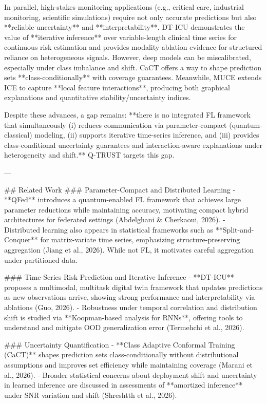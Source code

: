 In parallel, high-stakes monitoring applications (e.g., critical care, industrial monitoring, scientific simulations) require not only accurate predictions but also **reliable uncertainty** and **interpretability**. DT-ICU demonstrates the value of **iterative inference** over variable-length clinical time series for continuous risk estimation and provides modality-ablation evidence for structured reliance on heterogeneous signals. However, deep models can be miscalibrated, especially under class imbalance and shift. CaCT offers a way to shape prediction sets **class-conditionally** with coverage guarantees. Meanwhile, MUCE extends ICE to capture **local feature interactions**, producing both graphical explanations and quantitative stability/uncertainty indices.

Despite these advances, a gap remains: **there is no integrated FL framework that simultaneously (i) reduces communication via parameter-compact (quantum-classical) modeling, (ii) supports iterative time-series inference, and (iii) provides class-conditional uncertainty guarantees and interaction-aware explanations under heterogeneity and shift.** Q-TRUST targets this gap.

---

## Related Work
### Parameter-Compact and Distributed Learning
- **QFed** introduces a quantum-enabled FL framework that achieves large parameter reductions while maintaining accuracy, motivating compact hybrid architectures for federated settings (Abdelghani & Cherkaoui, 2026).
- Distributed learning also appears in statistical frameworks such as **Split-and-Conquer** for matrix-variate time series, emphasizing structure-preserving aggregation (Jiang et al., 2026). While not FL, it motivates careful aggregation under partitioned data.

### Time-Series Risk Prediction and Iterative Inference
- **DT-ICU** proposes a multimodal, multitask digital twin framework that updates predictions as new observations arrive, showing strong performance and interpretability via ablations (Guo, 2026).
- Robustness under temporal correlation and distribution shift is studied via **Koopman-based analysis for RNNs**, offering tools to understand and mitigate OOD generalization error (Termehchi et al., 2026).

### Uncertainty Quantification
- **Class Adaptive Conformal Training (CaCT)** shapes prediction sets class-conditionally without distributional assumptions and improves set efficiency while maintaining coverage (Marani et al., 2026).
- Broader statistical concerns about deployment shift and uncertainty in learned inference are discussed in assessments of **amortized inference** under SNR variation and shift (Shreshtth et al., 2026).

